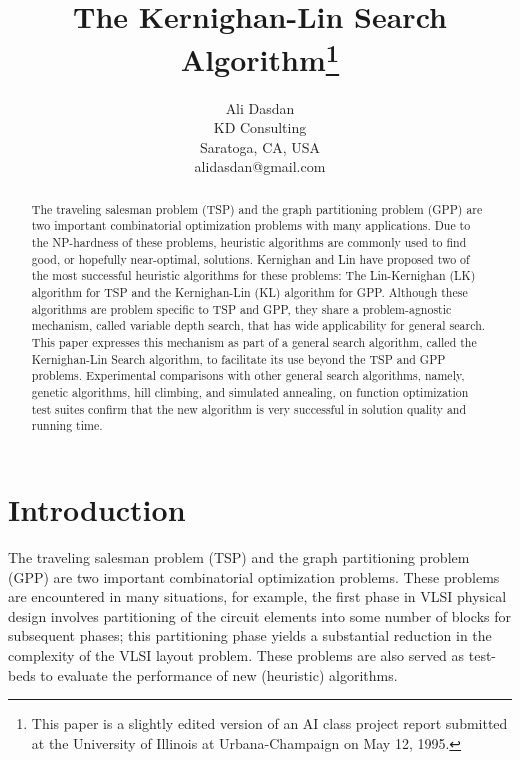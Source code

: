 \documentclass{article}
\begin{document}
\title{The Kernighan-Lin Search Algorithm\footnote{This paper is a
  slightly edited version of an AI class project report submitted at
  the University of Illinois at Urbana-Champaign on May 12, 1995.}}

\author{Ali Dasdan\\
  KD Consulting\\
  Saratoga, CA, USA\\
  alidasdan@gmail.com\\
}

\maketitle

\begin{abstract}
The traveling salesman problem (TSP) and the graph partitioning
problem (GPP) are two important combinatorial optimization problems
with many applications. Due to the NP-hardness of these problems,
heuristic algorithms are commonly used to find good, or hopefully
near-optimal, solutions. Kernighan and Lin have proposed two of the
most successful heuristic algorithms for these problems: The
Lin-Kernighan (LK) algorithm for TSP and the Kernighan-Lin (KL)
algorithm for GPP. Although these algorithms are problem specific to
TSP and GPP, they share a problem-agnostic mechanism, called variable
depth search, that has wide applicability for general search. This
paper expresses this mechanism as part of a general search algorithm,
called the Kernighan-Lin Search algorithm, to facilitate its use
beyond the TSP and GPP problems. Experimental comparisons with other
general search algorithms, namely, genetic algorithms, hill climbing,
and simulated annealing, on function optimization test suites confirm
that the new algorithm is very successful in solution quality and
running time.
\end{abstract}

\section{Introduction}

The traveling salesman problem (TSP) and the graph partitioning
problem (GPP) are two important combinatorial optimization
problems. These problems are encountered in many situations, for
example, the first phase in VLSI physical design involves partitioning
of the circuit elements into some number of blocks for subsequent
phases; this partitioning phase yields a substantial reduction in the
complexity of the VLSI layout problem. These problems are also served
as test-beds to evaluate the performance of new (heuristic)
algorithms.
\end{document}
